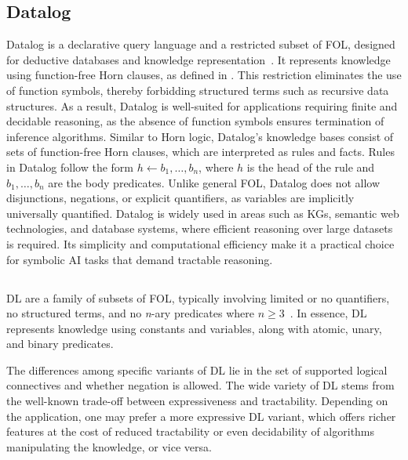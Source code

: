 \subsection{Datalog}\label{subsec:datalog}
%
Datalog is a declarative query language and a restricted subset of \gls{FOL}, designed for deductive databases and knowledge representation~\cite{DBLP:journals/jcss/AjtaiG94}.
%
It represents knowledge using function-free \gls{Horn} clauses, as defined in .
%
This restriction eliminates the use of function symbols, thereby forbidding structured terms such as recursive data structures.
%
As a result, Datalog is well-suited for applications requiring finite and decidable reasoning, as the absence of function symbols ensures termination of inference algorithms.
%
Similar to \gls{Horn} logic, Datalog’s knowledge bases consist of sets of function-free \gls{Horn} clauses, which are interpreted as rules and facts.
%
Rules in Datalog follow the form \(h \gets b_1, \dots, b_n\), where \(h\) is the head of the rule and \(b_1, \dots, b_n\) are the body predicates.
%
Unlike general \gls{FOL}, Datalog does not allow disjunctions, negations, or explicit quantifiers, as variables are implicitly universally quantified.
%
Datalog is widely used in areas such as \glspl{KG}, semantic web technologies, and database systems, where efficient reasoning over large datasets is required.
%
Its simplicity and computational efficiency make it a practical choice for symbolic \gls{AI} tasks that demand tractable reasoning.


\subsection{}\label{subsec:dl}
%
\Gls{DL} are a family of subsets of \gls{FOL}, typically involving limited or no quantifiers, no structured terms, and no \textit{n}-ary predicates where \(n \geq 3\)~\cite{DBLP:books/daglib/0041477}.
%
In essence, \gls{DL} represents knowledge using constants and variables, along with atomic, unary, and binary predicates.


The differences among specific variants of \gls{DL} lie in the set of supported logical connectives and whether negation is allowed.
%
The wide variety of \gls{DL} stems from the well-known trade-off between expressiveness and tractability.
%
Depending on the application, one may prefer a more expressive \gls{DL} variant, which offers richer features at the cost of reduced tractability or even decidability of algorithms manipulating the knowledge, or vice versa.


